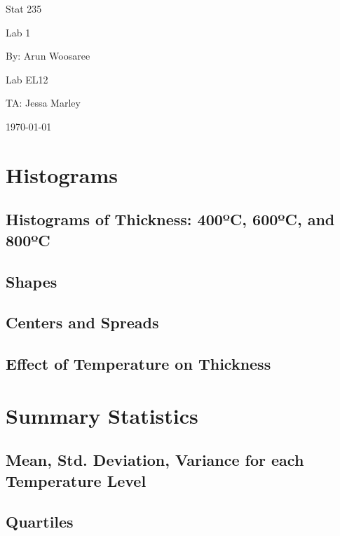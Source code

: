 \documentclass[letterpaper]{article}
\begin{document}
\begin{titlepage}
 \begin{center}
  \vspace*{1cm}
  \Huge
  Stat 235
  \vspace{1cm}

  Lab 1
  \vspace{1cm}

  By: Arun Woosaree
  \vspace{1cm}

  \Huge
  Lab EL12
  \vspace{1cm}

  TA: Jessa Marley
  \vspace{1cm}

  \today
  \vfill
 \end{center}
\end{titlepage}

\section{Histograms}
  \subsection{Histograms of Thickness: 400ºC, 600ºC, and 800ºC}
  \subsection{Shapes}
  \subsection{Centers and Spreads}
  \subsection{Effect of Temperature on Thickness}

\section{Summary Statistics}
  \subsection{Mean, Std. Deviation, Variance for each Temperature Level}
  \subsection{Quartiles}
\end{document}
